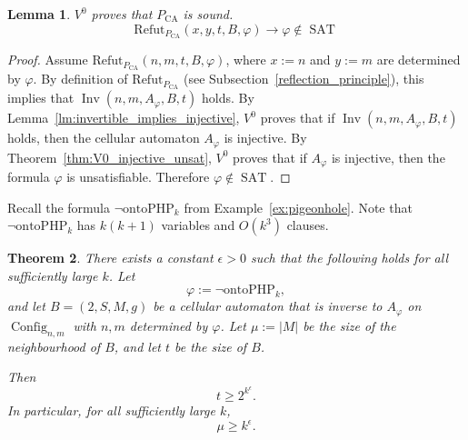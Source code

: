 \documentclass{article}
\theoremstyle{plain}
\newtheorem{theorem}{Theorem}[section]
\newtheorem{lemma}[theorem]{Lemma}
\theoremstyle{definition}
\DeclareMathOperator{\Config}{Config}
\DeclareMathOperator{\Inv}{Inv}
\DeclareMathOperator{\SAT}{SAT}
\begin{document}
\begin{lemma}\label{lm:V0_Q_sound}
$V^0$ proves that $P_{\mathrm{CA}}$ is sound.
    \[
    \mathrm{Refut}_{P_\mathrm{CA}}(x,y,t,B,\varphi) \longrightarrow \varphi \notin \SAT
    \]
\end{lemma}
\begin{proof}
Assume $ \mathrm{Refut}_{P_\mathrm{CA}}(n,m,t,B,\varphi)$, where $x:=n$ and $y:= m$ are determined by $\varphi$.  
By definition of $ \mathrm{Refut}_{P_\mathrm{CA}}$ (see Subsection~\ref{reflection_principle}), this implies that
$\Inv(n,m,A_\varphi,B,t)$ holds. By Lemma~\ref{lm:invertible_implies_injective}, $V^0$ proves that if
$\Inv(n,m,A_\varphi,B,t)$ holds, then the cellular automaton $A_\varphi$
is injective. By Theorem~\ref{thm:V0_injective_unsat}, $V^0$ proves that if
$A_\varphi$ is injective, then the formula $\varphi$ is unsatisfiable.
Therefore $\varphi \notin \SAT$.
\end{proof}


Recall the formula $\lnot \mathrm{ontoPHP}_k$ from Example~\ref{ex:pigeonhole}. Note that $\lnot \mathrm{ontoPHP}_k$ has $k(k+1)$ variables and $O(k^3)$ clauses.

\begin{theorem}\label{thm:main_lower_bound}
There exists a constant $\epsilon > 0$ such that the following holds for all sufficiently large $k$.
Let 
\[
\varphi := \lnot \mathrm{ontoPHP}_k,
\]
and let $B=(2,S,M,g)$ be a cellular automaton that is inverse to $A_\varphi$ \linebreak on $\Config_{n,m}$ with $n, m$ determined by $\varphi$. Let $\mu := |M|$ be the size of the neighbourhood of $B$, and let $t$ be the size of $B$.

Then
\[
t \ge 2^{k^\epsilon}.
\]
In particular, for all sufficiently large $k$,
\[
\mu \ge k^\epsilon.
\]
\end{theorem}
\end{document}
